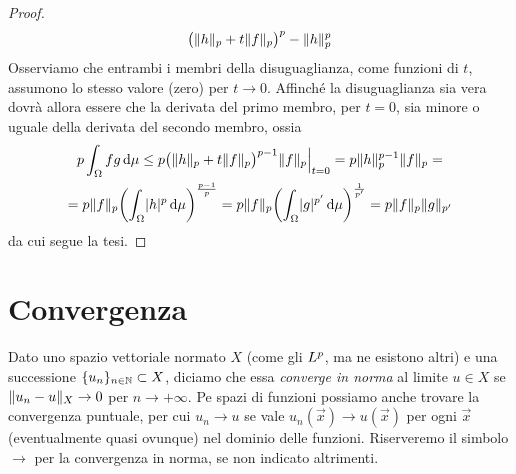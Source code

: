 \begin{proof}
\begin{multline}
        \bigl(\norm{h}_p+t\norm{f}_p\bigr)^p-\norm{h}_p^p
    \end{multline}
    Osserviamo che entrambi i membri della disuguaglianza, come funzioni di $t$, assumono lo stesso valore (zero) per $t\to 0$.
    Affinch\'e la disuguaglianza sia vera dovrà allora essere che la derivata del primo membro, per $t=0$, sia minore o uguale della derivata del secondo membro, ossia
    \begin{multline}
        p\int_\Omega fg\,\dd\mu\le
        p\bigl(\norm{h}_p+t\norm{f}_p\bigr)^{p-1}\norm{f}_p\Big\rvert_{t=0}=
        p\norm{h}_p^{p-1}\norm{f}_p=\\=
        p\norm{f}_p\biggl(\int_\Omega \abs{h}^p\,\dd\mu\biggr)^{\frac{p-1}{p}}=
        p\norm{f}_p\biggl(\int_\Omega \abs{g}^{p'}\,\dd\mu\biggr)^{\frac1{p'}}=p\norm{f}_p\norm{g}_{p'}
    \end{multline}
    da cui segue la tesi.
\end{proof}

\section{Convergenza}
Dato uno spazio vettoriale normato $X$ (come gli $\lclass[p]$, ma ne esistono altri) e una successione $\{u_n\}_{n\in\N}\subset X$, diciamo che essa \emph{converge in norma} al limite $u\in X$ se $\norm{u_n-u}_X\to 0$ per $n\to +\infty$.
Pe spazi di funzioni possiamo anche trovare la convergenza puntuale, per cui $u_n\to u$ se vale $u_n(\vec x)\to u(\vec x)$ per ogni $\vec x$ (eventualmente quasi ovunque) nel dominio delle funzioni.
Riserveremo il simbolo $\to$ per la convergenza in norma, se non indicato altrimenti.

